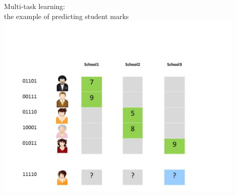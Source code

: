 \documentclass[]{beamer}
\renewcommand{\alert}[1]{\textbf{\color{putblue} #1}}
\begin{document}
\begin{frame}{Multi-task learning: \\
the example of predicting student marks}
\includegraphics[width=0.9\textwidth,trim = 0 0 100 100,clip]{Figures/pictures/Slide3}
\end{frame}





%
%
%
\end{document}
